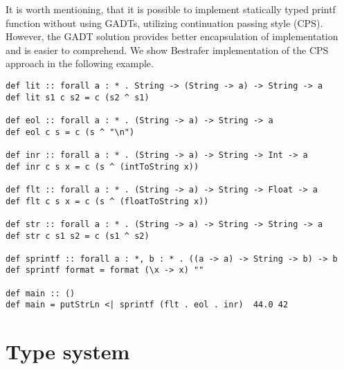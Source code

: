 \documentclass[declaration,shortabstract,english]{iithesis}
\begin{document}
It is worth mentioning, that it is possible to implement statically typed printf function
without using GADTs, utilizing continuation passing style (CPS)\cite{unparsing}.
However, the GADT solution provides better encapsulation of implementation and
is easier to comprehend. We show Bestrafer implementation of the CPS approach in the following example.
\begin{verbatim}
def lit :: forall a : * . String -> (String -> a) -> String -> a
def lit s1 c s2 = c (s2 ^ s1)

def eol :: forall a : * . (String -> a) -> String -> a
def eol c s = c (s ^ "\n")

def inr :: forall a : * . (String -> a) -> String -> Int -> a
def inr c s x = c (s ^ (intToString x))

def flt :: forall a : * . (String -> a) -> String -> Float -> a
def flt c s x = c (s ^ (floatToString x))

def str :: forall a : * . (String -> a) -> String -> String -> a
def str c s1 s2 = c (s1 ^ s2)

def sprintf :: forall a : *, b : * . ((a -> a) -> String -> b) -> b
def sprintf format = format (\x -> x) ""

def main :: ()
def main = putStrLn <| sprintf (flt . eol . inr)  44.0 42
\end{verbatim}

\chapter{Type system}
\end{document}

